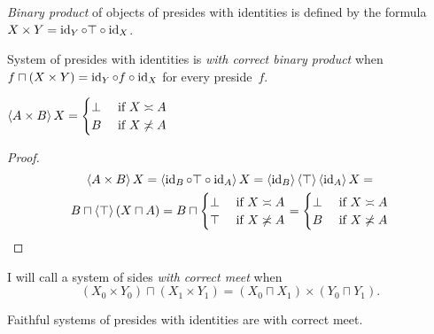 \begin{defn}
\emph{Binary product} of objects of presides with identities is defined by the formula $X\times Y=\operatorname{id}_Y\circ\top\circ\operatorname{id}_X$.
\end{defn}

\begin{defn}
System of presides with identities is \emph{with correct binary product} when $f\sqcap(X\times Y) = \operatorname{id}_Y\circ f\circ\operatorname{id}_X$
for every preside~$f$.
\end{defn}

\begin{prop}
$\left\langle A\times B\right\rangle X = \begin{cases}\bot&\text{ if }X\asymp A\\B&\text{ if }X\not\asymp A\end{cases}$
\end{prop}

\begin{proof}
~
\begin{multline*}
\left\langle A\times B\right\rangle X = \left\langle \operatorname{id}_B\circ\top\circ\operatorname{id}_A\right\rangle X =
\left\langle \operatorname{id}_B\right\rangle\left\langle \top\right\rangle\left\langle \operatorname{id}_A\right\rangle X = \\
B\sqcap\left\langle \top\right\rangle(X\sqcap A) =
B\sqcap\begin{cases}\bot&\text{ if }X\asymp A\\\top&\text{ if }X\not\asymp A\end{cases} =
\begin{cases}\bot&\text{ if }X\asymp A\\B&\text{ if }X\not\asymp A\end{cases}
\end{multline*}
\end{proof}

\begin{defn}
I will call a system of sides \emph{with correct meet} when
\[ (X_0\times Y_0)\sqcap(X_1\times Y_1) = (X_0\sqcap X_1)\times(Y_0\sqcap Y_1). \]
\end{defn}

\begin{prop}
Faithful systems of presides with identities are with correct meet.
\end{prop}

